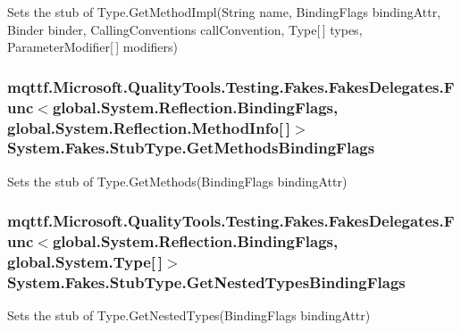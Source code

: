 Sets the stub of Type.\-Get\-Method\-Impl(\-String name, Binding\-Flags binding\-Attr, Binder binder, Calling\-Conventions call\-Convention, Type\mbox{[}$\,$\mbox{]} types, Parameter\-Modifier\mbox{[}$\,$\mbox{]} modifiers)

\hypertarget{class_system_1_1_fakes_1_1_stub_type_a74b0d9b57a4a9316253c5a2263e3311b}{
\subsubsection[{Get\-Methods\-Binding\-Flags}]{\setlength{\rightskip}{0pt plus 5cm}mqttf.\-Microsoft.\-Quality\-Tools.\-Testing.\-Fakes.\-Fakes\-Delegates.\-Func$<$global.\-System.\-Reflection.\-Binding\-Flags, global.\-System.\-Reflection.\-Method\-Info\mbox{[}$\,$\mbox{]}$>$ System.\-Fakes.\-Stub\-Type.\-Get\-Methods\-Binding\-Flags}}\label{class_system_1_1_fakes_1_1_stub_type_a74b0d9b57a4a9316253c5a2263e3311b}


Sets the stub of Type.\-Get\-Methods(\-Binding\-Flags binding\-Attr)

\hypertarget{class_system_1_1_fakes_1_1_stub_type_a2602bee550afdbb11adbbe8c93bf7292}{
\subsubsection[{Get\-Nested\-Types\-Binding\-Flags}]{\setlength{\rightskip}{0pt plus 5cm}mqttf.\-Microsoft.\-Quality\-Tools.\-Testing.\-Fakes.\-Fakes\-Delegates.\-Func$<$global.\-System.\-Reflection.\-Binding\-Flags, global.\-System.\-Type\mbox{[}$\,$\mbox{]}$>$ System.\-Fakes.\-Stub\-Type.\-Get\-Nested\-Types\-Binding\-Flags}}\label{class_system_1_1_fakes_1_1_stub_type_a2602bee550afdbb11adbbe8c93bf7292}


Sets the stub of Type.\-Get\-Nested\-Types(\-Binding\-Flags binding\-Attr)

